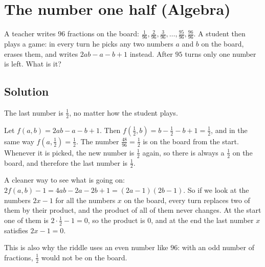 \section {The number one half (Algebra)}

A teacher writes $96$ fractions on the board: $\frac{1}{96}, \frac{2}{96}, \frac{3}{96}, \ldots, \frac{95}{96}, \frac{96}{96}$.
A student then plays a game: in every turn he picks any two numbers $a$ and $b$ on the board, erases them, and writes $2ab - a - b + 1$ instead.
After $95$ turns only one number is left. What is it?

\subsection{Solution}

The last number is $\frac{1}{2}$, no matter how the student plays.

Let $f(a,b) = 2ab - a - b + 1$. Then $f(\frac{1}{2}, b) = b - \frac{1}{2} - b + 1 = \frac{1}{2}$, and in the same way $f(a, \frac{1}{2}) = \frac{1}{2}$.
The number $\frac{48}{96} = \frac{1}{2}$ is on the board from the start. Whenever it is picked, the new number is $\frac{1}{2}$ again,
so there is always a $\frac{1}{2}$ on the board, and therefore the last number is $\frac{1}{2}$.

A cleaner way to see what is going on: $2f(a,b) - 1 = 4ab - 2a - 2b + 1 = (2a-1)(2b-1)$.
So if we look at the numbers $2x-1$ for all the numbers $x$ on the board, every turn replaces two of them by their product,
and the product of all of them never changes. At the start one of them is $2 \cdot \frac{1}{2} - 1 = 0$, so the product is $0$,
and at the end the last number $x$ satisfies $2x-1 = 0$.

This is also why the riddle uses an even number like $96$: with an odd number of fractions, $\frac{1}{2}$ would not be on the board.
